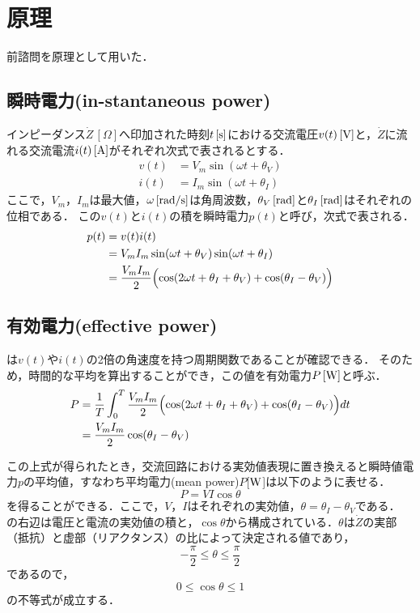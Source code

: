 \clearpage

\section{原理}
前諮問を原理として用いた．
\subsection{瞬時電力(in-stantaneous power)\cite{11300007922816}\cite{1130282271973066112}}
インピーダンス$\dot{Z}\,[\Omega]$へ印加された時刻$t\,[\rm{s}]$における交流電圧$v(t)\,[\rm{V}]$と，$\dot{Z}$に流れる交流電流$i(t)\,[\rm{A}]$がそれぞれ次式で表されるとする．
\begin{align}
	v(t) &= V_m\sin(\omega t+\theta_V)\\
	i(t) &= I_m\sin(\omega t + \theta_I)
\end{align}
ここで，$V_m$，$I_m$は最大値，$\omega\,[\rm{rad/s}]$は角周波数，$\theta_V\,[\rm{rad}]$と$\theta_I\,[\rm{rad}]$はそれぞれの位相である．
この$v(t)$と$i(t)$の積を瞬時電力$p(t)$と呼び，次式で表される．
\begin{align}
	p(t)&= v(t)i(t)\nonumber\\
	&=V_mI_m\sin(\omega t+\theta_V)\sin(\omega t + \theta_I)\nonumber\\
	&= \frac{V_mI_m}{2}\Bigl(\cos(2\omega t + \theta_I+\theta_V)+\cos(\theta_I - \theta_V)\Bigr)
	\label{eq:ip}
\end{align}

\subsection{有効電力(effective power)\cite{11300007922816}\cite{113028223066112}}
は$v(t)$や$i(t)$の2倍の角速度を持つ周期関数であることが確認できる．
そのため，時間的な平均を算出することができ，この値を有効電力$P\,[\rm{W}]$と呼ぶ．
\begin{align}
	P &=\frac{1}{T}\int_0^T \frac{V_mI_m}{2}\Bigl(\cos(2\omega t + \theta_I+\theta_V)+\cos(\theta_I - \theta_V)\Bigr) dt\nonumber\\
	&=\frac{V_mI_m}{2}\cos(\theta_I - \theta_V)
\end{align}

この上式が得られたとき，交流回路における実効値表現に置き換えると瞬時値電力$p$の平均値，すなわち平均電力(mean power)$P$[$\rm{W}$]は以下のように表せる．
\begin{equation}
	P = VI\cos\theta
	\label{eq:power}
\end{equation}
を得ることができる．ここで，$V$，$I$はそれぞれの実効値，$\theta=\theta_I-\theta_V$である．
の右辺は電圧と電流の実効値の積と，$\cos\theta$から構成されている．$\theta$は$\dot{Z}$の実部（抵抗）と虚部（リアクタンス）の比によって決定される値であり，
\begin{equation}
	-\frac{\pi}{2}\leq\theta\leq\frac{\pi}{2}
\end{equation}
であるので，
\begin{equation}
	0\leq\cos\theta\leq 1
	\label{eq:angle}
\end{equation}
の不等式が成立する．

